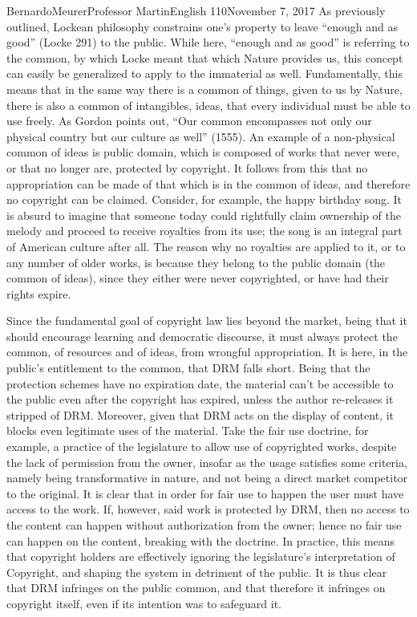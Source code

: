 \documentclass[12pt,letterpaper]{article}
\begin{document}
\begin{mla}{Bernardo}{Meurer}{Professor Martin}{English 110}{November 7, 2017}
        As previously outlined, Lockean philosophy constrains one's property to leave ``enough and as good'' (Locke 291) to the public. While here, ``enough and as good'' is referring to the common, by which Locke meant that which Nature provides us, this concept can easily be generalized to apply to the immaterial as well. Fundamentally, this means that in the same way there is a common of things, given to us by Nature, there is also a common of intangibles, ideas, that every individual must be able to use freely. As Gordon points out, ``Our common encompasses not only our physical country but our culture as well'' (1555). An example of a non-physical common of ideas is public domain, which is composed of works that never were, or that no longer are, protected by copyright. It follows from this that no appropriation can be made of that which is in the common of ideas, and therefore no copyright can be claimed. Consider, for example, the happy birthday song. It is absurd to imagine that someone today could rightfully claim ownership of the melody and proceed to receive royalties from its use; the song is an integral part of American culture after all. The reason why no royalties are applied to it, or to any number of older works, is because they belong to the public domain (the common of ideas), since they either were never copyrighted, or have had their rights expire.

        Since the fundamental goal of copyright law lies beyond the market, being that it should encourage learning and democratic discourse, it must always protect the common, of resources and of ideas, from wrongful appropriation. It is here, in the public's entitlement to the common, that DRM falls short. Being that the protection schemes have no expiration date, the material can't be accessible to the public even after the copyright has expired, unless the author re-releases it stripped of DRM. Moreover, given that DRM acts on the display of content, it blocks even legitimate uses of the material. Take the fair use doctrine, for example, a practice of the legislature to allow use of copyrighted works, despite the lack of permission from the owner, insofar as the usage satisfies some criteria, namely being transformative in nature, and not being a direct market competitor to the original. It is clear that in order for fair use to happen the user must have access to the work. If, however, said work is protected by DRM, then no access to the content can happen without authorization from the owner; hence no fair use can happen on the content, breaking with the doctrine. In practice, this means that copyright holders are effectively ignoring the legislature's interpretation of Copyright, and shaping the system in detriment of the public. It is thus clear that DRM infringes on the public common, and that therefore it infringes on copyright itself, even if its intention was to safeguard it.


\end{mla}
\end{document}
